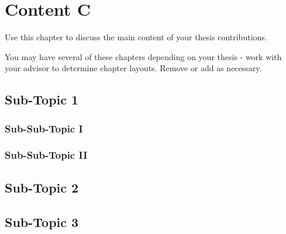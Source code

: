 \chapter{Content C}

Use this chapter to discuss the main content of your thesis contributions.

You may have several of these chapters depending on your thesis - work with your advisor to determine chapter layouts.
Remove or add as necessary.

\section{Sub-Topic 1}

\subsection{Sub-Sub-Topic I}

\subsection{Sub-Sub-Topic II}

\section{Sub-Topic 2}

\section{Sub-Topic 3}
